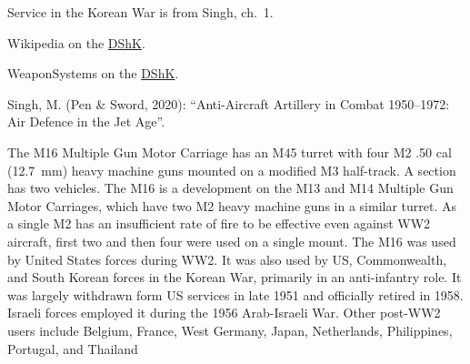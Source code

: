 \begin{withcounters}
{        Service in the Korean War is from Singh, ch.~1.

        \begin{notesources}
            \item Wikipedia on the \href{https://en.wikipedia.org/wiki/DShK}{DShK}.
            \item WeaponSystems on the \href{https://weaponsystems.net/system/744-DShK}{DShK}.
            \item Singh, M. (Pen \& Sword, 2020): “Anti-Aircraft Artillery in Combat 1950--1972: Air Defence in the Jet Age”.
        \end{notesources}

    }


    The M16 Multiple Gun Motor Carriage has an M45 turret with four M2 .50 cal (12.7~mm) heavy machine guns mounted on a modified M3 half-track. A section has two vehicles. The M16 is a development on the M13 and M14 Multiple Gun Motor Carriages, which have two M2 heavy machine guns in a similar turret. As a single M2 has an insufficient rate of fire to be effective even against WW2 aircraft, first two and then four were used on a single mount.
    The M16 was used by United States forces during WW2. It was also used by US, Commonwealth, and South Korean forces in the Korean War, primarily in an anti-infantry role. It was largely withdrawn form US services in late 1951 and officially retired in 1958. Israeli forces employed it during the 1956 Arab-Israeli War. Other post-WW2 users include Belgium, France, West Germany, Japan, Netherlands, Philippines, Portugal, and Thailand%


\end{withcounters}
